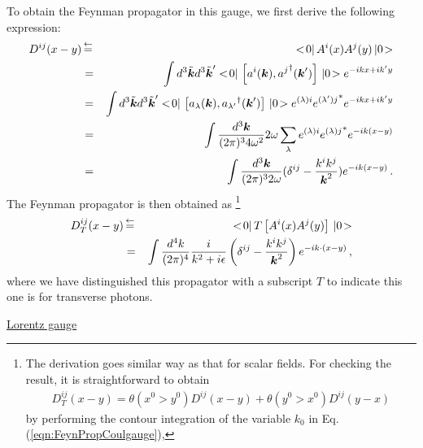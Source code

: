 To obtain the Feynman propagator in this gauge, we first derive the following
expression:
\begin{eqnarray}
D^{ij}(x-y)
&\,\mbox{$\stackrel{\leftarrow}{=}$}\,&
<\! 0 |\, A^i(x) A^j(y) \,| 0 \!>
\nonumber\\
&=&
\int
d^3 \tilde{\mbox{\boldmath $k$}} d^3 \tilde{\mbox{\boldmath $k$}}'
<\! 0 |\, \left[ a^i (\mbox{\boldmath $k$}), {a^j}^\dagger (\mbox{\boldmath $k$}') \right] \,| 0 \!>
e^{-ikx + ik'y}
\nonumber\\
&=&
\int
d^3 \tilde{\mbox{\boldmath $k$}} d^3 \tilde{\mbox{\boldmath $k$}}'
<\! 0 |\, \left[ a_{\lambda} (\mbox{\boldmath $k$}), {a_{\lambda'}}^\dagger (\mbox{\boldmath $k$}') \right] \,| 0 \!>
e^{(\lambda)i} {e^{(\lambda') j}}^*
e^{-ikx + ik'y}
\nonumber\\
&=&
\int
\frac{d^3 \mbox{\boldmath $k$}}{(2\pi)^3 4 \omega^2} 2\omega
\sum_\lambda 
e^{(\lambda)i} {e^{(\lambda) j}}^*
e^{-ik(x -y)}
\\
&=&
\int
\frac{d^3 \mbox{\boldmath $k$}}{(2\pi)^3 2 \omega} 
(\delta^{ij} - \frac{k^i k^j}{\mbox{\boldmath $k$}^2})
e^{-ik(x -y)} \,.
\end{eqnarray}
The Feynman propagator is then obtained as
\footnote{%
The derivation goes similar way as that for scalar fields.
For checking the result, it is straightforward to obtain
\begin{eqnarray*}
D_T^{ij}(x-y) = \theta(x^0 > y^0) D^{ij}(x-y) +\theta(y^0 > x^0) D^{ij}(y - x)
\end{eqnarray*}
by
performing the contour integration of the variable $k_0$ in Eq. (\ref{eqn:FeynPropCoulgauge}),
}%
\begin{eqnarray}
D^{ij}_T(x - y)
&\,\mbox{$\stackrel{\leftarrow}{=}$}\,&
<\! 0 |\, 
T\left[
A^i(x) A^j(y)
\right]
\,| 0 \!>
\nonumber\\
&=&
\int
\frac{d^4 k}{(2\pi)^4}
\frac{i}{k^2 + i\epsilon}
\left(
\delta^{ij}
-
\frac{k^i k^j}{\mbox{\boldmath $k$}^2}
\right)
e^{-ik \cdot (x- y)} \,,
\nonumber\\
\label{eqn:FeynPropCoulgauge}
\end{eqnarray}
where we have distinguished this propagator with a subscript $T$
to indicate this one is for transverse photons.

\bigskip

\bigskip

\noindent
\underline{Lorentz gauge}\\

